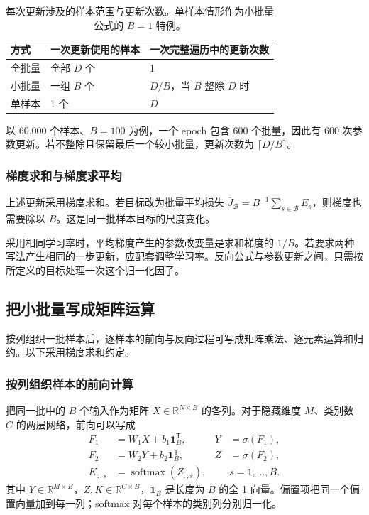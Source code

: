 \begin{table}[H]
\centering
\caption{每次更新涉及的样本范围与更新次数。单样本情形作为小批量公式的 $B=1$ 特例。}
\label{l10:tab:batch-types}
\begin{tabularx}{\linewidth}{lYY}
\toprule
方式 & 一次更新使用的样本 & 一次完整遍历中的更新次数\\
\midrule
全批量 & 全部 $D$ 个 & 1\\
小批量 & 一组 $B$ 个 & $D/B$，当 $B$ 整除 $D$ 时\\
单样本 & 1 个 & $D$\\
\bottomrule
\end{tabularx}
\end{table}

以 60,000 个样本、$B=100$ 为例，一个 epoch 包含 600 个批量，因此有 600 次参数更新。若不整除且保留最后一个较小批量，更新次数为 $\lceil D/B\rceil$。

\subsubsection{梯度求和与梯度求平均}
上述更新采用梯度求和。若目标改为批量平均损失 $\overline J_{\mathcal B}=B^{-1}\sum_{s\in\mathcal B}E_s$，则梯度也需要除以 $B$。这是同一批样本目标的尺度变化。

采用相同学习率时，平均梯度产生的参数改变量是求和梯度的 $1/B$。若要求两种写法产生相同的一步更新，应配套调整学习率。反向公式与参数更新之间，只需按所定义的目标处理一次这个归一化因子。

\subsection{把小批量写成矩阵运算}
按列组织一批样本后，逐样本的前向与反向过程可写成矩阵乘法、逐元素运算和归约。以下采用梯度求和约定。
\subsubsection{按列组织样本的前向计算}
把同一批中的 $B$ 个输入作为矩阵 $X\in\mathbb{R}^{N\times B}$ 的各列。对于隐藏维度 $M$、类别数 $C$ 的两层网络，前向可以写成
\begin{align}
 F_1&=W_1X+b_1\mathbf{1}_B^{\mathsf T},&Y&=\sigma(F_1),\\
 F_2&=W_2Y+b_2\mathbf{1}_B^{\mathsf T},&Z&=\sigma(F_2),\\
 K_{:,s}&=\operatorname{softmax}(Z_{:,s}),&&s=1,\ldots,B.
 \label{l10:eq:batch-forward}
\end{align}
其中 $Y\in\mathbb{R}^{M\times B}$，$Z,K\in\mathbb{R}^{C\times B}$，$\mathbf{1}_B$ 是长度为 $B$ 的全 1 向量。偏置项把同一个偏置向量加到每一列；softmax 对每个样本的类别列分别归一化。

